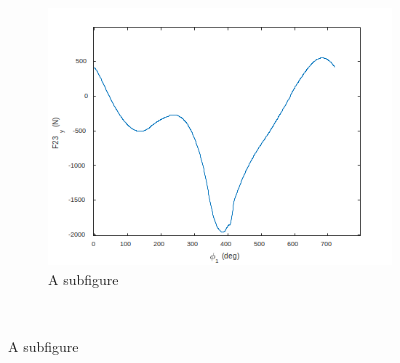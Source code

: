 \begin{figure}
\begin{subfigure}{.3\textwidth}
		\includegraphics[width=\linewidth]{09}
		\caption{A subfigure}
		\label{fig:sub3}
	\end{subfigure}\\


\end{figure}
